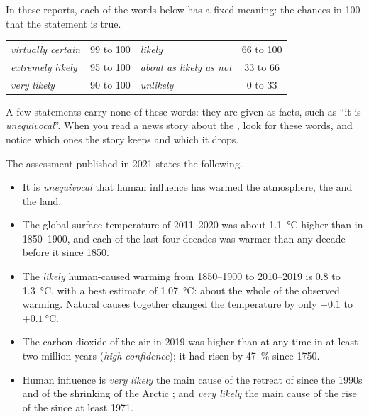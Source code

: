 In these reports, each of the words below has a fixed meaning: the chances
in 100 that the statement is true.

\begin{center}
{\small
\begin{tabular}{|l|c||l|c|}
\hline
\emph{virtually certain} & 99 to 100 & \emph{likely} & 66 to 100 \\
\emph{extremely likely} & 95 to 100 & \emph{about as likely as not} & 33 to 66 \\
\emph{very likely} & 90 to 100 & \emph{unlikely} & 0 to 33 \\
\hline
\end{tabular}}
\end{center}

\noindent A few statements carry none of these words: they are given as
facts, such as ``it is \emph{unequivocal}''. When you read a news story
about the , look for these words, and notice which ones the story
keeps and which it drops.

The assessment published in 2021 states the following.
\begin{itemize}
  \item It is \emph{unequivocal} that human influence has warmed the
        atmosphere, the  and the land.
  \item The global surface temperature of 2011--2020 was about
        \qty{1.1}{\degreeCelsius} higher than in 1850--1900, and each of
        the last four decades was warmer than any decade before it since
        1850.
  \item The \emph{likely} human-caused warming from 1850--1900 to
        2010--2019 is 0.8 to \qty{1.3}{\degreeCelsius}, with a best
        estimate of \qty{1.07}{\degreeCelsius}: about the whole of the
        observed warming. Natural causes together changed
        the temperature by only $-0.1$ to $+\qty{0.1}{\degreeCelsius}$.
  \item The carbon dioxide of the air in 2019 was higher than at any time
        in at least two million years (\emph{high confidence}); it had
        risen by 47~\% since 1750.
  \item Human influence is \emph{very likely} the main cause of the
        retreat of  since the 1990s and of the shrinking of the
        Arctic ; and \emph{very likely} the main cause of the rise
        of the  since at least 1971.
\end{itemize}

